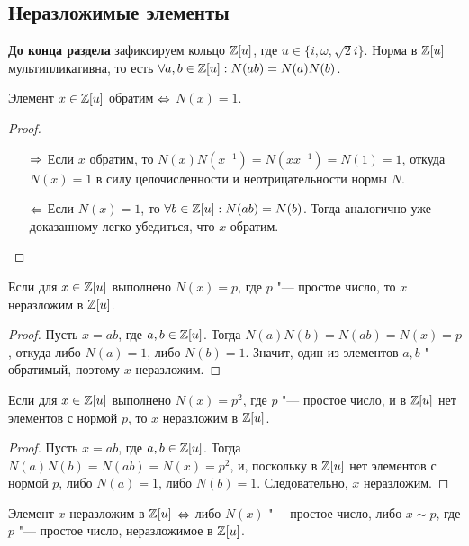 \subsection{Неразложимые элементы}

\textbf{До конца раздела} зафиксируем кольцо $\mathbb{Z}[u]$, где $u \in \{i, \omega, \sqrt{2}i\}$. Норма в $\mathbb{Z}[u]$ мультипликативна, то есть $\forall a, b \in \mathbb{Z}[u]: N(ab) = N(a)N(b)$.

\begin{proposition}
	Элемент $x \in \mathbb{Z}[u]$ обратим $\Leftrightarrow$ $N(x) = 1$.
\end{proposition}

\begin{proof}~
	\begin{itemize}
		\item[$\Rightarrow$] Если $x$ обратим, то $N(x)N(x^{-1}) = N(xx^{-1}) = N(1) = 1$, откуда $N(x) = 1$ в силу целочисленности и неотрицательности нормы $N$.
		\item[$\Leftarrow$] Если $N(x) = 1$, то $\forall b \in \mathbb{Z}[u]: N(ab) = N(b)$. Тогда аналогично уже доказанному легко убедиться, что $x$ обратим.\qedhere
	\end{itemize}
\end{proof}

\begin{proposition}
	Если для $x \in \mathbb{Z}[u]$ выполнено $N(x) = p$, где $p$ "--- простое число, то $x$ неразложим в $\mathbb{Z}[u]$.
\end{proposition}

\begin{proof}
	Пусть $x = ab$, где $a, b \in \mathbb{Z}[u]$. Тогда $N(a)N(b) = N(ab) = N(x) = p$, откуда либо $N(a) = 1$, либо $N(b) = 1$. Значит, один из элементов $a, b$ "--- обратимый, поэтому $x$ неразложим.
\end{proof}

\begin{proposition}
	Если для $x \in \mathbb{Z}[u]$ выполнено $N(x) = p^2$, где $p$ "--- простое число, и в $\mathbb{Z}[u]$ нет элементов с нормой $p$, то $x$ неразложим в $\mathbb{Z}[u]$.
\end{proposition}

\begin{proof}
	Пусть $x = ab$, где $a, b \in \mathbb{Z}[u]$. Тогда $N(a)N(b) = N(ab) = N(x) = p^2$, и, поскольку в $\mathbb{Z}[u]$ нет элементов с нормой $p$, либо $N(a) = 1$, либо $N(b) = 1$. Следовательно, $x$ неразложим.
\end{proof}

\begin{theorem}
	Элемент $x$ неразложим в $\mathbb{Z}[u]$ $\Leftrightarrow$ либо $N(x)$ "--- простое число, либо $x \sim p$, где $p$ "--- простое число, неразложимое в $\mathbb{Z}[u]$.
\end{theorem}

